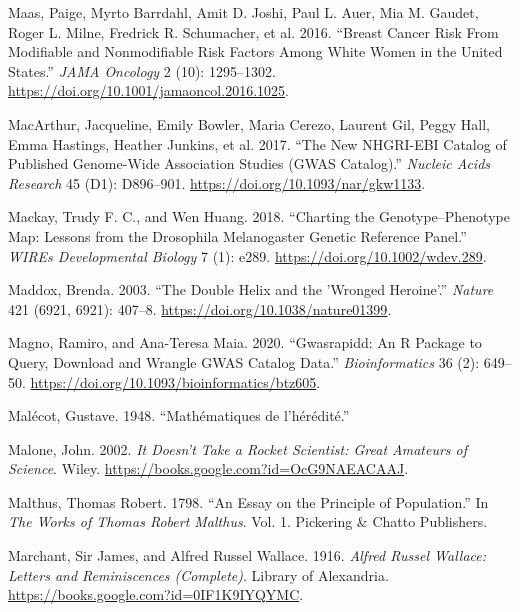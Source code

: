 \documentclass[
]{book}
\newlength{\cslhangindent}
\newlength{\cslentryspacingunit} %
\newenvironment{CSLReferences}[2] %
 {%
  \setlength{\parindent}{0pt}
  \ifodd #1
  \let\oldpar\par
  \def\par{\hangindent=\cslhangindent\oldpar}
  \fi
  \setlength{\parskip}{#2\cslentryspacingunit}
 }%
 {}
\begin{document}
\begin{CSLReferences}{1}{0}
\leavevmode{}%
Maas, Paige, Myrto Barrdahl, Amit D. Joshi, Paul L. Auer, Mia M. Gaudet, Roger L. Milne, Fredrick R. Schumacher, et al. 2016. {``Breast {Cancer Risk From Modifiable} and {Nonmodifiable Risk Factors Among White Women} in the {United States}.''} \emph{JAMA Oncology} 2 (10): 1295--1302. \url{https://doi.org/10.1001/jamaoncol.2016.1025}.

\leavevmode{}%
MacArthur, Jacqueline, Emily Bowler, Maria Cerezo, Laurent Gil, Peggy Hall, Emma Hastings, Heather Junkins, et al. 2017. {``The New {NHGRI-EBI Catalog} of Published Genome-Wide Association Studies ({GWAS Catalog}).''} \emph{Nucleic Acids Research} 45 (D1): D896--901. \url{https://doi.org/10.1093/nar/gkw1133}.

\leavevmode{}%
Mackay, Trudy F. C., and Wen Huang. 2018. {``Charting the Genotype--Phenotype Map: Lessons from the {Drosophila} Melanogaster {Genetic Reference Panel}.''} \emph{WIREs Developmental Biology} 7 (1): e289. \url{https://doi.org/10.1002/wdev.289}.

\leavevmode{}%
Maddox, Brenda. 2003. {``The Double Helix and the 'Wronged Heroine'.''} \emph{Nature} 421 (6921, 6921): 407--8. \url{https://doi.org/10.1038/nature01399}.

\leavevmode{}%
Magno, Ramiro, and Ana-Teresa Maia. 2020. {``Gwasrapidd: An {R} Package to Query, Download and Wrangle {GWAS} Catalog Data.''} \emph{Bioinformatics} 36 (2): 649--50. \url{https://doi.org/10.1093/bioinformatics/btz605}.

\leavevmode{}%
Malécot, Gustave. 1948. {``Mathématiques de l'hérédité.''}

\leavevmode{}%
Malone, John. 2002. \emph{It {Doesn}'t {Take} a {Rocket Scientist}: {Great Amateurs} of {Science}}. {Wiley}. \url{https://books.google.com?id=OcG9NAEACAAJ}.

\leavevmode{}%
Malthus, Thomas Robert. 1798. {``An Essay on the Principle of Population.''} In \emph{The Works of {Thomas Robert Malthus}}. Vol. 1. {Pickering \& Chatto Publishers}.

\leavevmode{}%
Marchant, Sir James, and Alfred Russel Wallace. 1916. \emph{Alfred {Russel Wallace}: {Letters} and {Reminiscences} ({Complete})}. {Library of Alexandria}. \url{https://books.google.com?id=0IF1K9IYQYMC}.


\end{CSLReferences}
\end{document}
